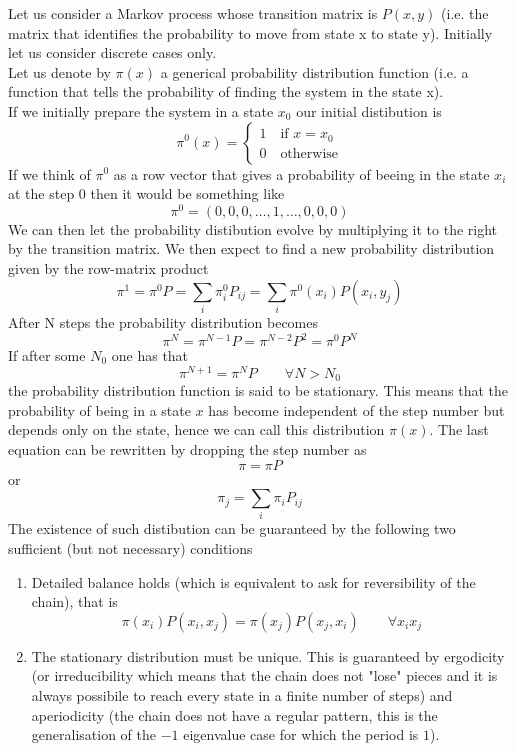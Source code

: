 \documentclass{article}
\begin{document}
    Let us consider a Markov process whose transition matrix is $P(x,y)$ (i.e. the matrix that identifies the probability to move from state x to state y). Initially let us consider 
    discrete cases only. \\
    Let us denote by $\pi(x)$ a generical probability distribution function (i.e. a function that tells the probability of finding the system in the state x). \\
    If we initially prepare the system in a state $x_0$ our initial distibution is 
    $$\pi^0(x) = 
    \begin{cases}
        1 \quad \text{if } x=x_0 \\
        0 \quad \text{otherwise}
    \end{cases}$$
    If we think of $\pi^0$ as a row vector that gives a probability of beeing in the state $x_i$ at the step $0$ then it would be something like
    $$\pi^0 = \left(0, 0, 0, \dots, 1, \dots, 0, 0, 0\right)$$
    We can then let the probability distibution evolve by multiplying it to the right by the transition matrix. We then expect to find 
    a new probability distribution given by the row-matrix product $$\pi^1 = \pi^0 P = \sum_i \pi^0_i P_{ij} = \sum_i \pi^0(x_i)P(x_i, y_j) $$
    After N steps the probability distribution becomes 
    $$\pi^N = \pi^{N-1} P = \pi^{N-2} P^2 = \pi^0 P^N$$
    If after some $N_0$ one has that
    $$\pi^{N+1} = \pi^N P \qquad \forall N > N_0$$
    the probability distribution function is said to be stationary. This means that the probability of being in a state $x$ has become independent 
    of the step number but depends only on the state, hence we can call this distribution $\pi(x)$. The last equation can be 
    rewritten by dropping the step number as 
    $$\pi = \pi P$$ 
    or 
    \begin{equation}
        \pi_j = \sum_i \pi_i P_{ij}
    \end{equation}
    The existence of such distibution can be guaranteed by the following two sufficient (but not necessary) conditions
    \begin{enumerate}
        \item Detailed balance holds (which is equivalent to ask for reversibility of the chain), that is 
        \begin{equation}
            \pi(x_i) P(x_i,x_j) = \pi(x_j) P(x_j,x_i) \qquad \forall x_i x_j
            \label{eq:detailed_balance}
        \end{equation}
        \item The stationary distribution must be unique. This is guaranteed by ergodicity (or irreducibility which means that the chain does not
        "lose" pieces and it is always possibile to reach every state in a finite number of steps) and aperiodicity (the chain does not have a regular pattern, this is 
        the generalisation of the $-1$ eigenvalue case for which the period is $1$).
    \end{enumerate}
\end{document}
